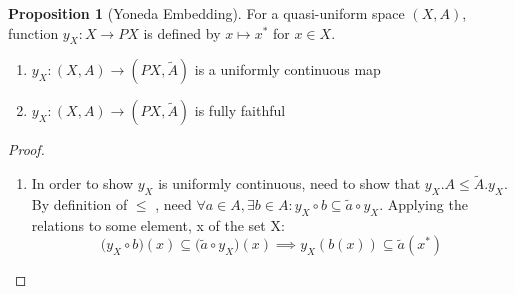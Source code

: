\documentclass[18pt,a4paper]{article}
\theoremstyle{definition}
\newtheorem{proop}{Proposition}[section]
\begin{document}
\newpage
\begin{proop}[Yoneda Embedding]
\item For a quasi-uniform space $(X,A)$, function $y_X:X \to PX$ is defined by $x\mapsto x^*$ for $x \in X$.
	\begin{enumerate}[label=(\alph*)]
		\item $y_X:(X,A) \rightarrow (PX,\tilde{A})$ is a uniformly continuous map
		\item $y_X:(X,A) \rightarrow (PX,\tilde{A})$ is fully faithful
	\end{enumerate}
\end{proop}
\begin{proof}
\item \begin{enumerate}[label=(\alph*)]
	\item In order to show $y_X$ is uniformly continuous, need to show that $y_X.A \leq \tilde{A}.y_X $.
		By definition of $\leq$ , need $\forall a\in A, \exists b \in A:
		y_X \circ b \subseteq \tilde{a} \circ y_X $. Applying the relations
		to some element, x of the set X:
		\begin{equation} \big(y_X \circ b\big)(x) \subseteq \big( \tilde{a} \circ y_X\big)(x) \implies
		y_X(b(x)) \subseteq \tilde{a}(x^*) \end{equation}


\end{enumerate}
\end{proof}
\end{document}
